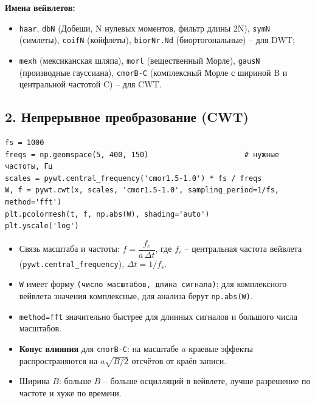 \documentclass[12pt,a4paper,openany]{book}
\providecommand{\tightlist}{\setlength{\itemsep}{0pt}\setlength{\parskip}{0pt}}
\begin{document}
\textbf{Имена вейвлетов:}

\begin{itemize}
\tightlist
\item
  \texttt{\textquotesingle{}\allowbreak{}haar\textquotesingle{}\allowbreak{}}, \texttt{\textquotesingle{}\allowbreak{}dbN\textquotesingle{}\allowbreak{}} (Добеши, N нулевых моментов, фильтр длины 2N), \texttt{\textquotesingle{}\allowbreak{}symN\textquotesingle{}\allowbreak{}} (симлеты), \texttt{\textquotesingle{}\allowbreak{}coifN\textquotesingle{}\allowbreak{}} (койфлеты), \texttt{\textquotesingle{}\allowbreak{}biorNr.\allowbreak{}Nd\textquotesingle{}\allowbreak{}} (биортогональные) -- для DWT;
\item
  \texttt{\textquotesingle{}\allowbreak{}mexh\textquotesingle{}\allowbreak{}} (мексиканская шляпа), \texttt{\textquotesingle{}\allowbreak{}morl\textquotesingle{}\allowbreak{}} (вещественный Морле), \texttt{\textquotesingle{}\allowbreak{}gausN\textquotesingle{}\allowbreak{}} (производные гауссиана), \texttt{\textquotesingle{}\allowbreak{}cmorB-C\textquotesingle{}\allowbreak{}} (комплексный Морле с шириной B и центральной частотой C) -- для CWT.
\end{itemize}

\subsection*{2. Непрерывное преобразование (CWT)}

\begin{Verbatim}[fontsize=\small, breaklines, breakanywhere]
fs = 1000
freqs = np.geomspace(5, 400, 150)                      # нужные частоты, Гц
scales = pywt.central_frequency('cmor1.5-1.0') * fs / freqs
W, f = pywt.cwt(x, scales, 'cmor1.5-1.0', sampling_period=1/fs, method='fft')
plt.pcolormesh(t, f, np.abs(W), shading='auto')
plt.yscale('log')
\end{Verbatim}

\begin{itemize}
\tightlist
\item
  Связь масштаба и частоты: \(f = \dfrac{f_c}{a\,\Delta t}\), где \(f_c\) -- центральная частота вейвлета (\texttt{pywt.\allowbreak{}central\_\allowbreak{}frequency}), \(\Delta t = 1/f_s\).
\item
  \texttt{W} имеет форму \texttt{(\allowbreak{}число\ масштабов,\allowbreak{}\ длина\ сигнала)}; для комплексного вейвлета значения комплексные, для анализа берут \texttt{np.\allowbreak{}abs(\allowbreak{}W)}.
\item
  \texttt{method=\allowbreak{}\textquotesingle{}\allowbreak{}fft\textquotesingle{}\allowbreak{}} значительно быстрее для длинных сигналов и большого числа масштабов.
\item
  \textbf{Конус влияния} для \texttt{cmorB-C}: на масштабе \(a\) краевые эффекты распространяются на \(a\sqrt{B/2}\) отсчётов от краёв записи.
\item
  Ширина \(B\): больше \(B\) -- больше осцилляций в вейвлете, лучше разрешение по частоте и хуже по времени.
\end{itemize}
\end{document}
